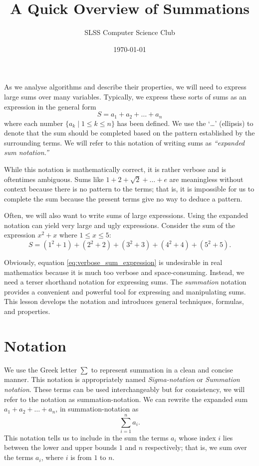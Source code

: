 \documentclass[prereq]{cslesson}
\title{A Quick Overview of Summations}
\author{SLSS Computer Science Club}
\date{\today}
\numberwithin{equation}{section}
\begin{document}
    
\maketitle

As we analyse algorithms and describe their properties, we will need to express large sums over many variables. Typically, we express these sorts of sums as an 
expression in the general form
\begin{equation*}
    S=a_1+a_2+\ldots+a_n
    \label{eq:verbose_sum}
\end{equation*}
where each number $\{a_k \mid 1 \leq k \leq n\}$ has been defined. We use the `\ldots' (ellipsis) to denote that the sum should be
completed based on the pattern established by the surrounding terms. We will refer to this notation of writing sums
as \textit{``expanded sum notation.''}
 
While this notation is mathematically correct, it is rather verbose and is oftentimes ambiguous.
Sums like $1+2+\sqrt{2}+\ldots+e$ are meaningless without context because there is no pattern to the terms; that is,
it is impossible for us to complete the sum because the present terms give no way to deduce a pattern.

Often, we will also want to write sums of large expressions. Using the expanded notation can yield very large and
ugly expressions. Consider the sum of the expression $x^2+x$ where $1 \leq x \leq 5$:
\begin{equation}
    S=(1^2+1)+(2^2+2)+(3^2+3)+(4^2+4)+(5^2+5).
    \label{eq:verbose_sum_expression}
\end{equation}

Obviously, equation \ref{eq:verbose_sum_expression} is undesirable in real mathematics because it is much too verbose and space-consuming.
Instead, we need a terser shorthand notation for expressing sums. The \textit{summation} notation provides a convenient and powerful tool for 
expressing and manipulating sums. This lesson develops the notation and introduces general techniques, formulas, and properties.

\section{Notation}
We use the Greek letter $\sum$ to represent summation in a clean and concise manner. This notation is appropriately named \textit{Sigma-notation} or \textit{Summation notation}. These terms can be used interchangeably but for consistency, we will refer to the notation as summation-notation. We can rewrite the expanded sum $a_1+a_2+\ldots+a_n$, in summation-notation as
\begin{equation}
    \sum^n_{i=1}a_i.
    \label{eq:first_summation}
\end{equation}
This notation tells us to include in the sum the terms $a_i$ whose index $i$ lies between the lower and upper bounds $1$ and $n$ respectively; that is, we sum over the terms $a_i$, where $i$ is from $1$ to $n$.
\end{document}
